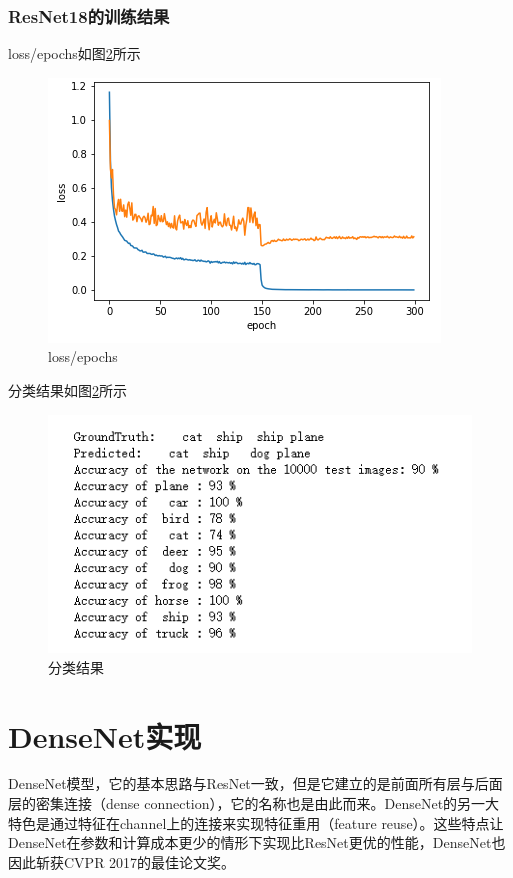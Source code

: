 \documentclass[UTF8,a4paper,10pt]{ctexart}
\begin{document}
\subsubsection{ResNet18的训练结果}

loss/epochs如图\ref{fig:1}所示
\begin{figure}[H]
    \centering
    \includegraphics[scale=1]{5.png}
    \caption{loss/epochs}
    \label{fig:1}
\end{figure}

分类结果如图\ref{fig:1}所示
\begin{figure}[H]
    \centering
    \includegraphics[scale=1]{7.png}
    \caption{分类结果}
    \label{fig:1}
\end{figure}




\section{DenseNet实现}
DenseNet模型，它的基本思路与ResNet一致，但是它建立的是前面所有层与后面层的密集连接（dense connection），它的名称也是由此而来。DenseNet的另一大特色是通过特征在channel上的连接来实现特征重用（feature reuse）。这些特点让DenseNet在参数和计算成本更少的情形下实现比ResNet更优的性能，DenseNet也因此斩获CVPR 2017的最佳论文奖。
\end{document}
